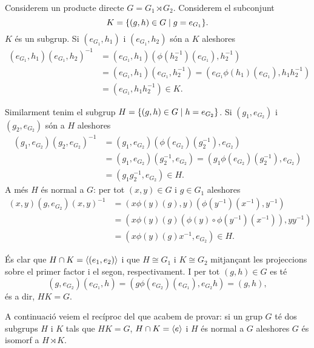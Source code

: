 \documentclass[12pt]{article}
\begin{document}
\parbreak

Considerem un producte directe \( G = G_1 \rtimes G_2 \). Considerem el subconjunt
\begin{equation*}
	K = \{ (g,h) \in G \mid g = e_{G_1} \}.
\end{equation*}
\( K \) és un subgrup. Si \( (e_{G_1},h_1) \) i \( (e_{G_1},h_2) \) són a \( K \)
aleshores
\begin{align*}
	(e_{G_1}, h_1)(e_{G_1}, h_2)^{-1} & = (e_{G_1}, h_1)(\phi(h_2^{-1})(e_{G_1}), h_2^{-1})
	\\
																		& = (e_{G_1},h_1)(e_{G_1}, h_2^{-1}) = (e_{G_1}
																		\phi(h_1)(e_{G_1}), h_1h_2^{-1}) \\
																		& = (e_{G_1}, h_1h_2^{-1}) \in K.
\end{align*}

Similarment tenim el subgrup \( H = \{ (g,h) \in G \mid h = e_{G_2} \} \). Si \(
(g_1,e_{G_2}) \) i \( (g_2,e_{G_2}) \) són a \( H \) aleshores 
\begin{align*}
	(g_1,e_{G_2})(g_2, e_{G_2})^{-1} & = (g_1,e_{G_2})(\phi(e_{G_2})(g_2^{-1}), e_{G_2}) \\
																	 & = (g_1,e_{G_2})(g_2^{-1}, e_{G_2}) = (g_1
																	 \phi(e_{G_2})(g_2^{-1}), e_{G_2}) \\
																	 & = (g_1 g_2^{-1}, e_{G_2}) \in H.
\end{align*}
A més \( H \) és normal a \( G \): per tot \( (x,y) \in G \) i \( g \in G_1 \) aleshores 
\begin{align*}
	(x,y)(g,e_{G_2})(x,y)^{-1} &= (x \phi(y)(g), y)\left(\phi(y^{-1})(x^{-1}), y^{-1}\right) \\
														 & = \left(x \phi(y)(g) \left(\phi(y) \circ
														 \phi(y^{-1})(x^{-1})\right), yy^{-1}\right) \\
														 & = (x \phi(y)(g) x^{-1}, e_{G_2}) \in H.
\end{align*}

És clar que \( H \cap K = \left\langle (e_1, e_2) \right\rangle \)	i que \( H \cong G_1 \) i \( K \cong G_2 \)
mitjançant les projeccions sobre el primer factor i el segon, respectivament. I per tot \(
(g,h) \in G \) es té
\begin{equation*}
	(g,e_{G_2})(e_{G_1}, h) = (g \phi(e_{G_2})(e_{G_1}), e_{G_2}h) = (g,h),
\end{equation*}
és a dir, \( HK = G \). 

A continuació veiem el recíproc del que acabem de provar: si un grup \( G \) té dos
subgrups \( H \) i \( K \) tals que \( HK = G \), \( H \cap K = \left\langle e \right\rangle \) i \( H \) és
normal a \( G \) aleshores \( G \) és isomorf a \( H \rtimes K \). 
\end{document}
